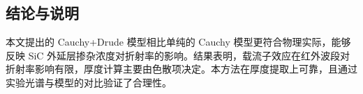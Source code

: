\subsection{结论与说明}
本文提出的 Cauchy+Drude 模型相比单纯的 Cauchy 模型更符合物理实际，能够反映 SiC 外延层掺杂浓度对折射率的影响。结果表明，载流子效应在红外波段对折射率影响有限，厚度计算主要由色散项决定。本方法在厚度提取上可靠，且通过实验光谱与模型的对比验证了合理性。
